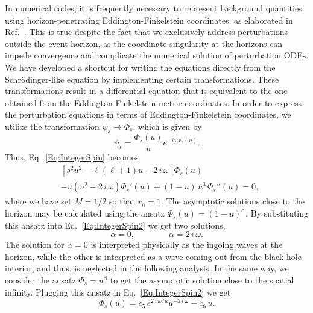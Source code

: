 In numerical codes, it is frequently necessary to represent background quantities using horizon-penetrating Eddington-Finkelstein coordinates, as elaborated in Ref.~\cite{qnmspectral}. This is true despite the fact that we exclusively address perturbations outside the event horizon, as the coordinate singularity at the horizons can impede convergence and complicate the numerical solution of perturbation ODEs. We have developed a shortcut for writing the equations directly from the Schrödinger-like equation by implementing certain transformations. These transformations result in a differential equation that is equivalent to the one obtained from the Eddington-Finkelstein metric coordinates. In order to express the perturbation equations in terms of Eddington-Finkelstein coordinates, we utilize the transformation $\psi_{s}\to \Phi_s$, which is given by
%
\begin{equation}\label{Eq:TransN1}
  \psi_{s}= \frac{\Phi_{s}(u)}{u}e^{-i\omega\,r_*(u)}.
\end{equation}
%
Thus, Eq.~\eqref{Eq:IntegerSpin} becomes
%
\begin{equation}\label{Eq:IntegerSpin2}
  \begin{split}
    &\left[s^2u^2-\ell\left(\ell+1\right)u-2\,i\,\omega\right]\Phi_{s}(u)\\
    &-u\left(u^2-2\,i\,\omega\right)\Phi_{s}'(u)+\left(1-u\right)\,u^3\,\Phi_{s}''(u)=0,\end{split}
\end{equation}
%
where we have set $M=1/2$ so that $r_h=1$. The asymptotic solutions close to the horizon may be calculated using the ansatz $\Phi_{s}(u)=(1-u)^{\alpha}$. By substituting this ansatz into Eq.~\eqref{Eq:IntegerSpin2} we get two solutions,
%
\begin{equation}\label{Eq:AsympHorion}
  \alpha=0,\qquad\qquad \alpha=2\,i\,\omega.
\end{equation}
%
The solution for $\alpha =0$ is interpreted physically as the ingoing waves at the horizon, while the other is interpreted as a wave coming out from the black hole interior, and thus, is neglected in the following analysis. In the same way, we consider the ansatz $\Phi_{s}=u^{\beta}$ to get the asymptotic solution close to the spatial infinity. Plugging this ansatz in Eq.~\eqref{Eq:IntegerSpin2} we get
%
\begin{equation}\label{Eq:AsymInfinite}
  \Phi_{s}(u)=c_5\,e^{2\,i\,\omega/u}u^{-2\,i\,\omega}+c_6\,u.
\end{equation}
